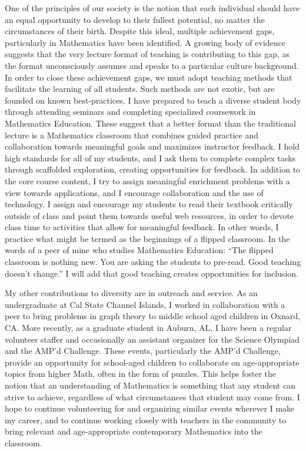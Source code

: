 \documentclass[11pt]{article}
\begin{document}
One of the principles of our society is the notion that each individual
should have an equal opportunity to develop to their fullest potential,
no matter the circumstances of their birth. Despite this ideal, multiple
achievement gaps, particularly in Mathematics have been identified. A
growing body of evidence suggests that the very lecture format of
teaching is contributing to this gap, as the format unconsciously
assumes and speaks to a particular culture background. In order to close
these achievement gaps, we must adopt teaching methods that facilitate
the learning of all students. Such methods are not exotic, but are
founded on known best-practices. I have prepared to teach a diverse
student body through attending seminars and completing specialized
coursework in Mathematics Education. These suggest that a better format
than the traditional lecture is a Mathematics classroom that combines
guided practice and collaboration towards meaningful goals and maximizes
instructor feedback. I hold high standards for all of my students, and I
ask them to complete complex tasks through scaffolded exploration,
creating opportunities for feedback. In addition to the core course
content, I try to assign meaningful enrichment problems with a view
towards applications, and I encourage collaboration and the use of
technology. I assign and encourage my students to read their textbook
critically outside of class and point them towards useful web resources,
in order to devote class time to activities that allow for meaningful
feedback. In other words, I practice what might be termed as the
beginnings of a flipped classroom. In the words of a peer of mine who
studies Mathematics Education: ``The flipped classroom is nothing new.
You are asking the students to pre-read. Good teaching doesn't change.''
I will add that good teaching creates opportunities for inclusion.

My other contributions to diversity are in outreach and service. As an
undergraduate at Cal State Channel Islands, I worked in collaboration
with a peer to bring problems in graph theory to middle school aged
children in Oxnard, CA. More recently, as a graduate student in Auburn,
AL, I have been a regular volunteer staffer and occasionally an
assistant organizer for the Science Olympiad and the AMP'd Challenge.
These events, particularly the AMP'd Challenge, provide an opportunity
for school-aged children to collaborate on age-appropriate topics from
higher Math, often in the form of puzzles. This helps foster the notion
that an understanding of Mathematics is something that any student can
strive to achieve, regardless of what circumstances that student may
come from. I hope to continue volunteering for and organizing similar
events wherever I make my career, and to continue working closely with
teachers in the community to bring relevant and age-appropriate
contemporary Mathematics into the classroom.
\end{document}
